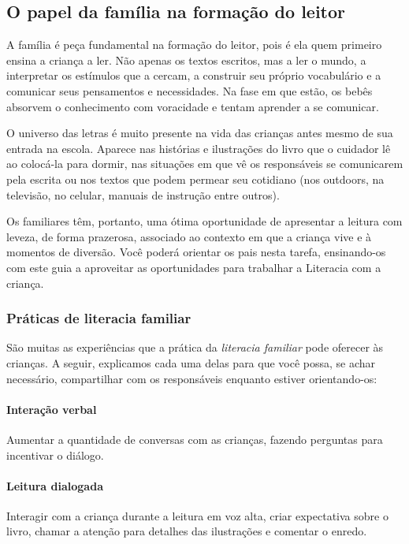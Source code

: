 \documentclass[11pt]{extarticle}
\begin{document}
\subsection{O papel da família na formação do leitor}
A família é peça fundamental na formação do leitor, pois é ela quem primeiro 
ensina a criança a ler. Não apenas os textos escritos, mas a ler o mundo, a 
interpretar os estímulos que a cercam, a construir seu próprio vocabulário e a 
comunicar seus pensamentos e necessidades. Na fase em que estão, os bebês 
absorvem o conhecimento com voracidade e tentam aprender a se comunicar. 

O universo das letras é muito presente na vida das crianças antes mesmo de sua 
entrada na escola. Aparece nas histórias e ilustrações do livro que o cuidador 
lê ao colocá-la para dormir, nas situações em que vê os responsáveis se comunicarem 
pela escrita ou nos textos que podem permear seu cotidiano (nos outdoors, na 
televisão, no celular, manuais de instrução entre outros). 

Os familiares têm, 
portanto, uma ótima oportunidade de apresentar a leitura com leveza, de forma 
prazerosa, associado ao contexto em que a criança vive e à momentos de diversão. 
Você poderá orientar os pais nesta tarefa, ensinando-os com este guia a aproveitar 
as oportunidades para trabalhar a Literacia com a criança.


\subsubsection{Práticas de literacia familiar} 

São muitas as experiências que a prática da \textit{literacia familiar} 
pode oferecer às crianças. A seguir, explicamos cada uma delas para que você possa, 
se achar necessário, compartilhar com os responsáveis enquanto estiver orientando-os: 

\paragraph{Interação verbal} Aumentar a quantidade de conversas com as 
crianças, fazendo perguntas para incentivar o diálogo.

\paragraph{Leitura dialogada} Interagir com a criança durante a leitura 
em voz alta, criar expectativa sobre o livro, chamar a atenção para detalhes 
das ilustrações e comentar o enredo.
\end{document}
